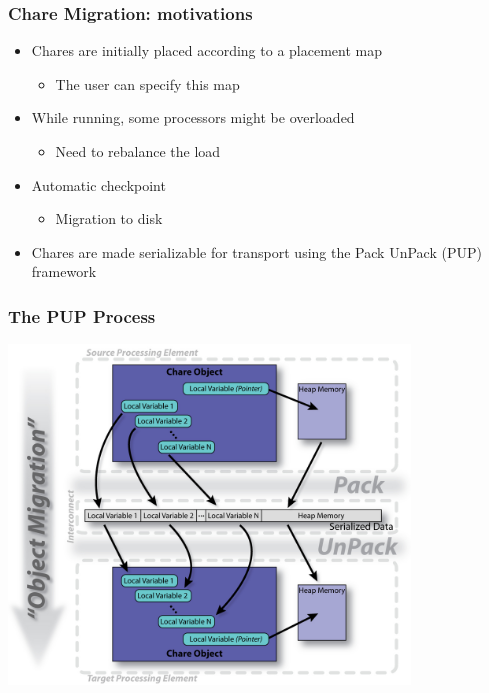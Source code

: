 \begin{frame}[fragile]
\frametitle{Chare Migration: motivations}
\begin{itemize}
\item Chares are initially placed according to a placement map
\begin{itemize}
\item The user can specify this map
\end{itemize}
\item While running, some processors might be overloaded
\begin{itemize}
\item Need to rebalance the load
\end{itemize}
\item Automatic checkpoint
\begin{itemize}
\item Migration to disk
\end{itemize}
\item Chares are made serializable for transport using the Pack UnPack (PUP) framework
\end{itemize}
\end{frame}

\begin{frame}[fragile]
\frametitle{The PUP Process}
  \begin{center}
    \includegraphics[width=0.8\textwidth]{figures/PUPProcess.png}
  \end{center}
\end{frame}


